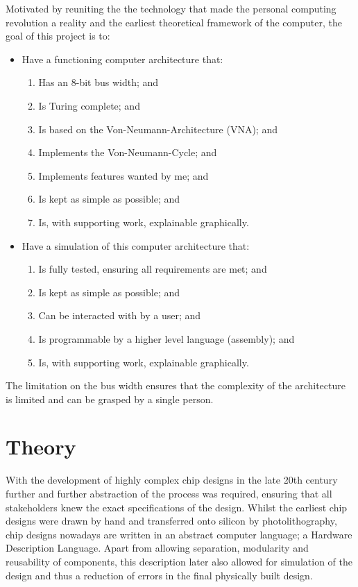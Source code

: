 Motivated by reuniting the the technology that made the personal computing revolution a reality and the earliest theoretical framework of the computer, the goal of this project is to: 
\begin{itemize}
  \item Have a functioning computer architecture that:
 \begin{enumerate}
    \item Has an 8-bit bus width; and
    \item Is Turing complete; and
    \item Is based on the Von-Neumann-Architecture (VNA); and
    \item Implements the Von-Neumann-Cycle; and
    \item Implements features wanted by me; and  
    \item Is kept as simple as possible; and
    \item Is, with supporting work, explainable graphically.
  \end{enumerate}
  \item Have a simulation of this computer architecture that: 
  \begin{enumerate}
    \item Is fully tested, ensuring all requirements are met; and
    \item Is kept as simple as possible; and
    \item Can be interacted with by a user; and
    \item Is programmable by a higher level language (assembly); and
    \item Is, with supporting work, explainable graphically.
  \end{enumerate}
  
\end{itemize}

The limitation on the bus width ensures that the complexity of the architecture is limited and can be grasped by a single person.


\section{Theory}
With the development of highly complex chip designs in the late 20th century further and further abstraction of the process was required, ensuring that all stakeholders knew the exact specifications of the design. \cite{1214355} Whilst the earliest chip designs were drawn by hand and transferred onto silicon by photolithography, chip designs nowadays are written in an abstract computer language; a Hardware Description Language. Apart from allowing separation, modularity and reusability of components, this description later also allowed for simulation of the design and thus a reduction of errors in the final physically built design. 

